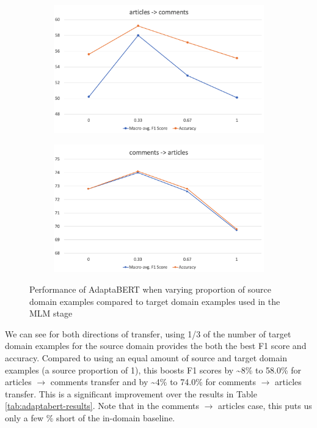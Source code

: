 \begin{figure}[ht]
    \centering
    \begin{subfigure}{\textwidth}
        \centering
        \includegraphics[scale=0.3]{0-img/src-proportion-articles-comments.png}
    \end{subfigure}
    \begin{subfigure}{\textwidth}
        \centering
        \includegraphics[scale=0.3]{0-img/src-proportion-comments-articles.png}
    \end{subfigure}
    \caption{Performance of AdaptaBERT when varying proportion of source domain examples compared to target domain examples used in the MLM stage}
    \label{fig:src-proportion}
\end{figure}

We can see for both directions of transfer, using 1/3 of the number of target domain examples for the source domain provides the both the best F1 score and accuracy. Compared to using an equal amount of source and target domain examples (a source proportion of 1), this boosts F1 scores by \textasciitilde 8\% to 58.0\% for articles $ \rightarrow $ comments transfer and by \textasciitilde 4\% to 74.0\% for comments $ \rightarrow $ articles transfer. This is a significant improvement over the results in Table \ref{tab:adaptabert-results}. Note that in the comments $ \rightarrow $ articles case, this puts us only a few \% short of the in-domain baseline.

